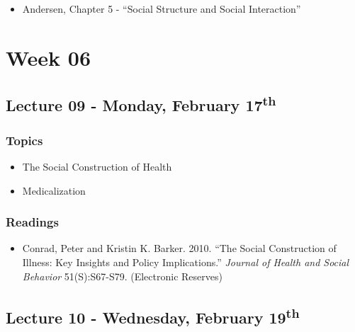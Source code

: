 \documentclass[]{book}
\providecommand{\tightlist}{%
  \setlength{\itemsep}{0pt}\setlength{\parskip}{0pt}}
\begin{document}
\begin{itemize}
\tightlist
\item
  Andersen, Chapter 5 - ``Social Structure and Social Interaction''
\end{itemize}

\newpage

\hypertarget{week-06}{%
\section*{Week 06}\label{week-06}}

\hypertarget{lecture-09---monday-february-17th}{%
\subsection*{\texorpdfstring{Lecture 09 - Monday, February 17\textsuperscript{th}}{Lecture 09 - Monday, February 17th}}\label{lecture-09---monday-february-17th}}

\hypertarget{topics-10}{%
\subsubsection*{Topics}\label{topics-10}}

\begin{itemize}
\tightlist
\item
  The Social Construction of Health
\item
  Medicalization
\end{itemize}

\hypertarget{readings-9}{%
\subsubsection*{Readings}\label{readings-9}}

\begin{itemize}
\tightlist
\item
  Conrad, Peter and Kristin K. Barker. 2010. ``The Social Construction of Illness: Key Insights and Policy Implications.'' \emph{Journal of Health and Social Behavior} 51(S):S67-S79. (Electronic Reserves)
\end{itemize}

\hypertarget{lecture-10---wednesday-february-19th}{%
\subsection*{\texorpdfstring{Lecture 10 - Wednesday, February 19\textsuperscript{th}}{Lecture 10 - Wednesday, February 19th}}\label{lecture-10---wednesday-february-19th}}
\end{document}
